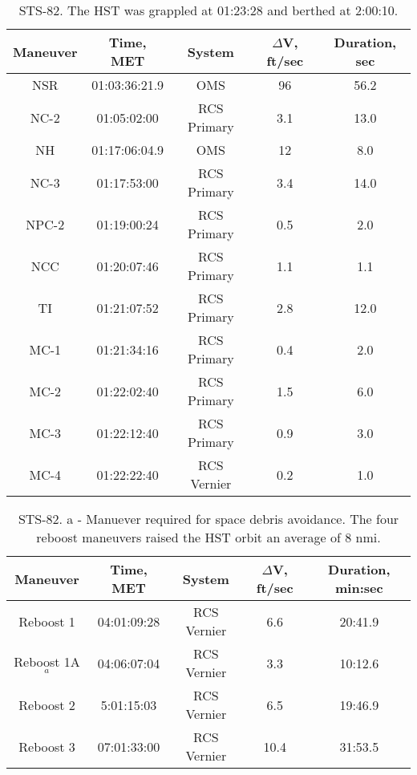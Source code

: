 \documentclass[onecolumn,10pt]{jhwhw}
\begin{document}
\begin{table}[t!]
\begin{center}
\begin{tabular}{|c |c |c |c |c|}
\hline
Maneuver & Time, MET & System & $\Delta$V, ft/sec & Duration, sec \\
\hline
NSR   & 01:03:36:21.9  & OMS         & 96  & 56.2 \\ \hline
NC-2  & 01:05:02:00    & RCS Primary & 3.1 & 13.0 \\ \hline
NH    & 01:17:06:04.9  & OMS         & 12  & 8.0  \\ \hline
NC-3  & 01:17:53:00    & RCS Primary & 3.4 & 14.0 \\ \hline
NPC-2 & 01:19:00:24    & RCS Primary & 0.5 & 2.0  \\ \hline
NCC   & 01:20:07:46    & RCS Primary & 1.1 & 1.1  \\ \hline
TI    & 01:21:07:52    & RCS Primary & 2.8 & 12.0 \\ \hline
MC-1  & 01:21:34:16    & RCS Primary & 0.4 & 2.0  \\ \hline
MC-2  & 01:22:02:40    & RCS Primary & 1.5 & 6.0  \\ \hline
MC-3  & 01:22:12:40    & RCS Primary & 0.9 & 3.0  \\ \hline
MC-4  & 01:22:22:40    & RCS Vernier & 0.2 & 1.0  \\ \hline
\end{tabular}
\end{center}
\caption{STS-82. The HST was grappled at 01:23:28 and berthed at 2:00:10.}
\end{table}

\begin{table}[t!]
\begin{center}
\begin{tabular}{|c |c |c |c |c|}
\hline
Maneuver & Time, MET & System & $\Delta$V, ft/sec & Duration, min:sec \\
\hline
Reboost 1 & 04:01:09:28 & RCS Vernier & 6.6  & 20:41.9 \\ \hline
Reboost 1A$_a$ & 04:06:07:04 & RCS Vernier & 3.3  & 10:12.6 \\ \hline
Reboost 2 & 5:01:15:03 & RCS Vernier & 6.5  & 19:46.9 \\ \hline
Reboost 3 & 07:01:33:00 & RCS Vernier & 10.4 & 31:53.5 \\ \hline
\end{tabular}
\end{center}
\caption{STS-82. a - Manuever required for space debris avoidance. The four reboost maneuvers raised the HST orbit an average of 8 nmi.}
\end{table}
\end{document}
